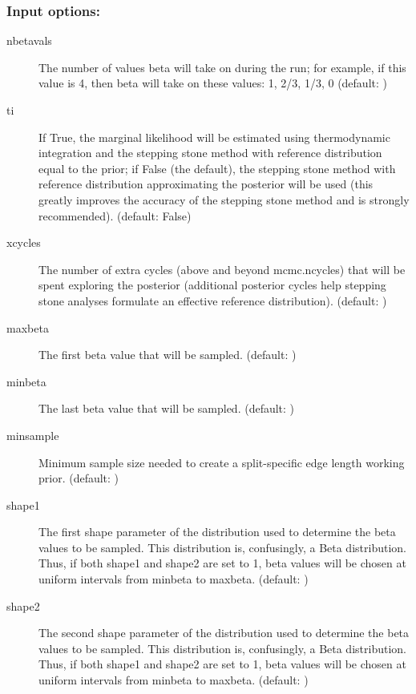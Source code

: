 \subsubsection{Input options:}\begin{description}
\item[\bftt  nbetavals] The number of values beta will take on during the run; for example, if this value is 4, then beta will take on these values: 1, 2/3, 1/3, 0 (default: {})
\item[\bftt  ti] If True, the marginal likelihood will be estimated using thermodynamic integration and the stepping stone method with reference distribution equal to the prior; if False (the default), the stepping stone method with reference distribution approximating the posterior will be used (this greatly improves the accuracy of the stepping stone method and is strongly recommended). (default: {\bftt  False})
\item[\bftt  xcycles] The number of extra cycles (above and beyond mcmc.ncycles) that will be spent exploring the posterior (additional posterior cycles help stepping stone analyses formulate an effective reference distribution). (default: {})
\item[\bftt  maxbeta] The first beta value that will be sampled. (default: {})
\item[\bftt  minbeta] The last beta value that will be sampled. (default: {})
\item[\bftt  minsample] Minimum sample size needed to create a split-specific edge length working prior. (default: {})
\item[\bftt  shape1] The first shape parameter of the distribution used to determine the beta values to be sampled. This distribution is, confusingly, a Beta distribution. Thus, if both shape1 and shape2 are set to 1, beta values will be chosen at uniform intervals from minbeta to maxbeta. (default: {})
\item[\bftt  shape2] The second shape parameter of the distribution used to determine the beta values to be sampled. This distribution is, confusingly, a Beta distribution. Thus, if both shape1 and shape2 are set to 1, beta values will be chosen at uniform intervals from minbeta to maxbeta. (default: {})
\end{description}
